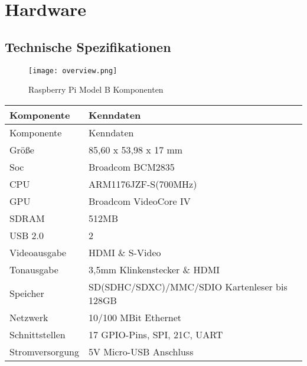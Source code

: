 \section{Hardware}
\subsection{Technische Spezifikationen}

\begin{figure}[h]
  \begin{center}		%
    \texttt{[image: overview.png]}
  		  \caption{Raspberry Pi Model B Komponenten}
     \label{raspPic_Komp}
  \end{center}
\end{figure}

\begin{longtable}{||l|l||}

\hline
Komponente & Kenndaten\\ \hline\hline
\endfirsthead
\hline
Komponente & Kenndaten \\ \hline\hline
\endhead

Größe & 85,60 x 53,98 x 17 mm\\ \hline
Soc & Broadcom BCM2835\\ \hline
CPU & ARM1176JZF-S(700MHz)\\ \hline
GPU & Broadcom VideoCore IV \\ \hline
SDRAM & 512MB\\ \hline
USB 2.0 & 2\\ \hline
Videoausgabe & HDMI \& S-Video\\ \hline
Tonausgabe & 3,5mm Klinkenstecker \& HDMI\\ \hline
Speicher & SD(SDHC/SDXC)/MMC/SDIO Kartenleser bis 128GB\\ \hline
Netzwerk & 10/100 MBit Ethernet\\ \hline
Schnittstellen & 17 GPIO-Pins, SPI, 21C, UART\\ \hline
Stromversorgung & 5V Micro-USB Anschluss\\ \hline

\end{longtable}
\cite{bib.RaspPi}\cite{bib.RaspPiGuide}


\newpage

